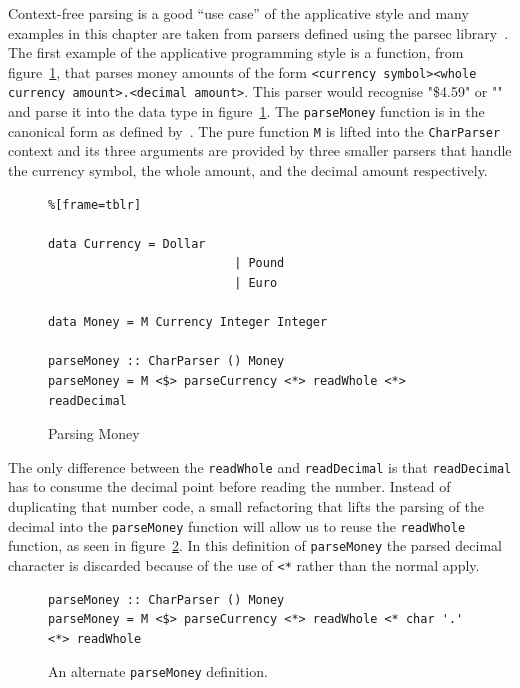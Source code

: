  Context-free parsing is a good ``use case'' of the applicative style and many examples in this chapter are taken from parsers defined using the parsec library~\citep{parsec}. The first example of the applicative programming style is a function, from figure~\ref{parseMoney}, that parses money amounts of the form \texttt{<currency symbol><whole currency amount>.<decimal amount>}. This parser would recognise "\$4.59" or "" and parse it into the  data type in figure~\ref{parseMoney}. The \texttt{parseMoney} function is in the canonical form as defined by~\citep{mcbrideIdioms}. The pure function \texttt{M} is lifted into the \texttt{CharParser} context and its three arguments are provided by three smaller parsers that handle the currency symbol, the whole amount, and the decimal amount respectively. 


\begin{figure}[t]
 \begin{lstlisting}%[frame=tblr]

data Currency = Dollar
                          | Pound
                          | Euro
              
data Money = M Currency Integer Integer

parseMoney :: CharParser () Money
parseMoney = M <$> parseCurrency <*> readWhole <*> readDecimal
 \end{lstlisting}
 \caption{Parsing Money}
 \label{parseMoney}
 \end{figure}
 
The only difference between the \texttt{readWhole} and \texttt{readDecimal} is that \texttt{readDecimal} has to consume the decimal point before reading the number. Instead of duplicating that number code, a small refactoring that lifts the parsing of the decimal into the \texttt{parseMoney} function will allow us to reuse the \texttt{readWhole} function, as seen in figure~\ref{altParseMoney}. In this definition of \texttt{parseMoney} the parsed decimal character is discarded because of the use of \texttt{<*} rather than the normal apply.

\begin{figure}[t]
 \begin{lstlisting}
parseMoney :: CharParser () Money
parseMoney = M <$> parseCurrency <*> readWhole <* char '.' <*> readWhole
 \end{lstlisting}
 \caption{An alternate \texttt{parseMoney} definition.}
 \label{altParseMoney}
\end{figure}

